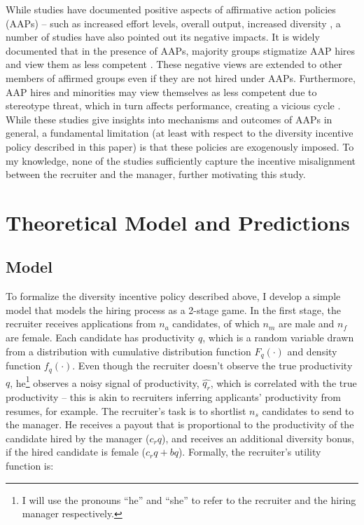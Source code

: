 \documentclass[11pt]{article}
\begin{document}
While studies have documented positive aspects of affirmative action policies (AAPs) -- such as increased effort levels, overall output, increased diversity \parencite{schotter_asymmetric_1992,balafoutas_affirmative_2012,niederle_how_2012}, a number of studies have also pointed out its negative impacts. It is widely documented that in the presence of AAPs, majority groups stigmatize AAP hires and view them as less competent \parencite{leslie_stigma_2013,heilman_affirmative_1997,petters_negative_2020}. These negative views are extended to other members of affirmed groups even if they are not hired under AAPs. Furthermore, AAP hires and minorities may view themselves as less competent due to stereotype threat, which in turn affects performance, creating a vicious cycle \parencite{leslie_stigma_2013}. While these studies give insights into mechanisms and outcomes of AAPs in general, a fundamental limitation (at least with respect to the diversity incentive policy described in this paper) is that these policies are exogenously imposed. To my knowledge, none of the studies sufficiently capture the incentive misalignment between the recruiter and the manager, further motivating this study.


\section{Theoretical Model and Predictions}

\subsection{Model}

To formalize the diversity incentive policy described above, I develop a simple model that models the hiring process as a 2-stage game.
In the first stage, the recruiter receives applications from $n_a$ candidates, of which $n_m$ are male and $n_f$ are female. Each candidate has productivity $q$, which is a random variable drawn from a distribution with cumulative distribution function $F_q(\cdot)$ and density function $f_q(\cdot)$. Even though the recruiter doesn't observe the true productivity $q$, he\footnote{I will use the pronouns ``he'' and ``she'' to refer to the recruiter and the hiring manager respectively.} observes a noisy signal of productivity, $\hat{q_r}$, which is correlated with the true productivity -- this is akin to recruiters inferring applicants' productivity from resumes, for example.
The recruiter's task is to shortlist $n_s$ candidates to send to the manager. He receives a payout that is proportional to the productivity of the candidate hired by the manager ($c_rq$), and receives an additional diversity bonus, if the hired candidate is female ($c_rq + bq$). Formally, the recruiter's utility function is:
\end{document}
